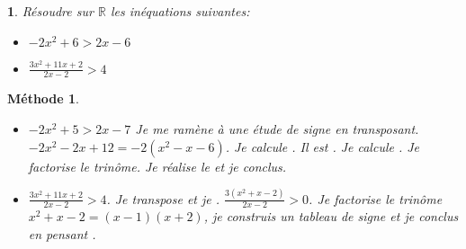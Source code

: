 \documentclass{beamer}
\newtheorem{exercise}[theorem]{\translate{Exercise}}
\newtheorem{methode}[theorem]{{Méthode}}
\begin{document}
   \begin{frame}
  \begin{exercise}
    Résoudre sur $\mathbb{R}$ les inéquations suivantes:
    \begin{itemize}
      \item $-2x^2+6>2x-6$
     \item $\frac{3x^2+11x+2}{2x-2}>4$
   \end{itemize}    
  \end{exercise} 
  \end{frame}
  
  \begin{frame}
  \begin{methode}
    \begin{itemize}
      \item $-2x^2+5>2x-7$ Je me ramène à une étude de signe en transposant.
      $-2x^2-2x+12=-2(x^2-x-6)$. Je calcule . Il
      est . Je calcule .
      Je  factorise le trinôme. Je réalise le  et
      je conclus.
     
      \item $\frac{3x^2+11x+2}{2x-2}>4$. Je transpose et je 
      .
    $\frac{3(x^2+x-2)}{2x-2}>0$. Je factorise le trinôme 
    $x^2+x-2=(x-1)(x+2)$, je construis un tableau de signe et je conclus en pensant
    .
   \end{itemize}    
  \end{methode} 
  \end{frame}


  
\end{document}
